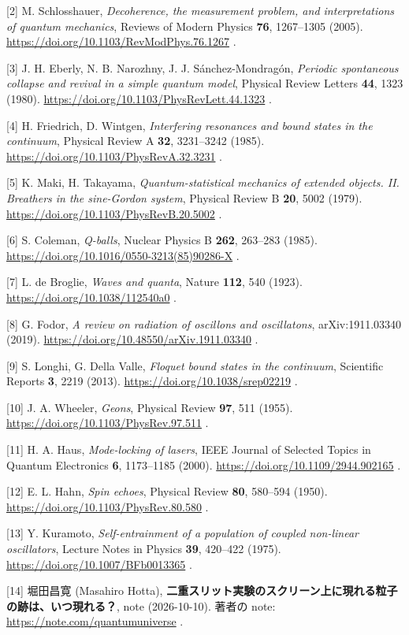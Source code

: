 \documentclass[
  a4paper,
]{ltjsarticle}
\begin{document}
{[}2{]} M. Schlosshauer, \emph{Decoherence, the measurement problem, and
interpretations of quantum mechanics}, Reviews of Modern Physics
\textbf{76}, 1267--1305 (2005).
\url{https://doi.org/10.1103/RevModPhys.76.1267} .

{[}3{]} J. H. Eberly, N. B. Narozhny, J. J. Sánchez-Mondragón,
\emph{Periodic spontaneous collapse and revival in a simple quantum
model}, Physical Review Letters \textbf{44}, 1323 (1980).
\url{https://doi.org/10.1103/PhysRevLett.44.1323} .

{[}4{]} H. Friedrich, D. Wintgen, \emph{Interfering resonances and bound
states in the continuum}, Physical Review A \textbf{32}, 3231--3242
(1985). \url{https://doi.org/10.1103/PhysRevA.32.3231} .

{[}5{]} K. Maki, H. Takayama, \emph{Quantum-statistical mechanics of
extended objects. II. Breathers in the sine-Gordon system}, Physical
Review B \textbf{20}, 5002 (1979).
\url{https://doi.org/10.1103/PhysRevB.20.5002} .

{[}6{]} S. Coleman, \emph{Q-balls}, Nuclear Physics B \textbf{262},
263--283 (1985). \url{https://doi.org/10.1016/0550-3213(85)90286-X} .

{[}7{]} L. de Broglie, \emph{Waves and quanta}, Nature \textbf{112}, 540
(1923). \url{https://doi.org/10.1038/112540a0} .

{[}8{]} G. Fodor, \emph{A review on radiation of oscillons and
oscillatons}, arXiv:1911.03340 (2019).
\url{https://doi.org/10.48550/arXiv.1911.03340} .

{[}9{]} S. Longhi, G. Della Valle, \emph{Floquet bound states in the
continuum}, Scientific Reports \textbf{3}, 2219 (2013).
\url{https://doi.org/10.1038/srep02219} .

{[}10{]} J. A. Wheeler, \emph{Geons}, Physical Review \textbf{97}, 511
(1955). \url{https://doi.org/10.1103/PhysRev.97.511} .

{[}11{]} H. A. Haus, \emph{Mode-locking of lasers}, IEEE Journal of
Selected Topics in Quantum Electronics \textbf{6}, 1173--1185 (2000).
\url{https://doi.org/10.1109/2944.902165} .

{[}12{]} E. L. Hahn, \emph{Spin echoes}, Physical Review \textbf{80},
580--594 (1950). \url{https://doi.org/10.1103/PhysRev.80.580} .

{[}13{]} Y. Kuramoto, \emph{Self-entrainment of a population of coupled
non-linear oscillators}, Lecture Notes in Physics \textbf{39}, 420--422
(1975). \url{https://doi.org/10.1007/BFb0013365} .

{[}14{]} 堀田昌寛 (Masahiro Hotta),
\textbf{二重スリット実験のスクリーン上に現れる粒子の跡は、いつ現れる？},
note (2026-10-10). 著者の note: \url{https://note.com/quantumuniverse} .
\end{document}
